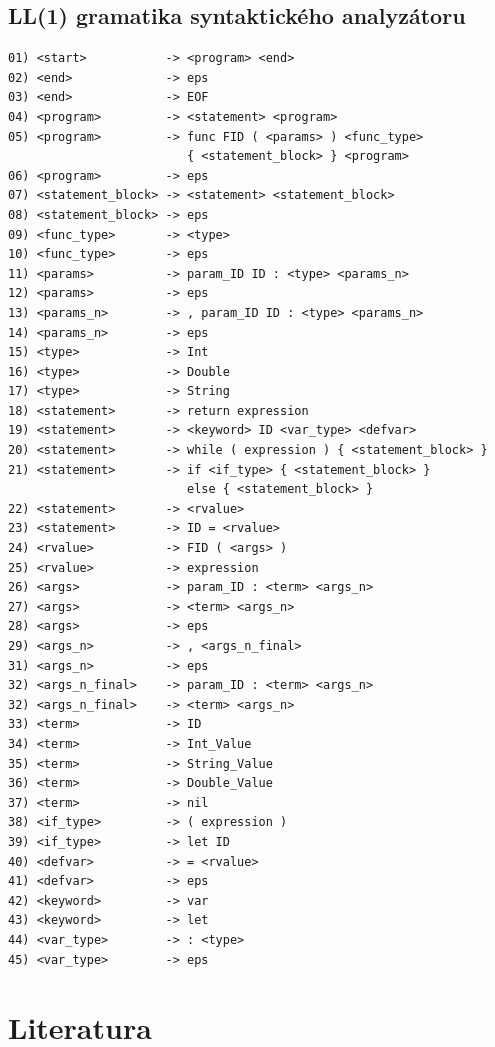 \documentclass[a4paper, 11pt]{article}
\begin{document}
\subsection{LL(1) gramatika syntaktického analyzátoru}
    \begin{verbatim}
01) <start>           -> <program> <end>
02) <end>             -> eps
03) <end>             -> EOF
04) <program>         -> <statement> <program>
05) <program>         -> func FID ( <params> ) <func_type> 
                         { <statement_block> } <program>
06) <program>         -> eps
07) <statement_block> -> <statement> <statement_block>
08) <statement_block> -> eps
09) <func_type>       -> <type>
10) <func_type>       -> eps
11) <params>          -> param_ID ID : <type> <params_n>
12) <params>          -> eps
13) <params_n>        -> , param_ID ID : <type> <params_n>
14) <params_n>        -> eps
15) <type>            -> Int
16) <type>            -> Double
17) <type>            -> String 
18) <statement>       -> return expression
19) <statement>       -> <keyword> ID <var_type> <defvar> 
20) <statement>       -> while ( expression ) { <statement_block> }
21) <statement>       -> if <if_type> { <statement_block> }
                         else { <statement_block> } 
22) <statement>       -> <rvalue> 
23) <statement>       -> ID = <rvalue> 
24) <rvalue>          -> FID ( <args> )
25) <rvalue>          -> expression
26) <args>            -> param_ID : <term> <args_n>
27) <args>            -> <term> <args_n>
28) <args>            -> eps
29) <args_n>          -> , <args_n_final>
31) <args_n>          -> eps
32) <args_n_final>    -> param_ID : <term> <args_n>
32) <args_n_final>    -> <term> <args_n>
33) <term>            -> ID
34) <term>            -> Int_Value
35) <term>            -> String_Value
36) <term>            -> Double_Value
37) <term>            -> nil
38) <if_type>         -> ( expression )
39) <if_type>         -> let ID
40) <defvar>          -> = <rvalue> 
41) <defvar>          -> eps
42) <keyword>         -> var
43) <keyword>         -> let
44) <var_type>        -> : <type>
45) <var_type>        -> eps
    \end{verbatim}
    \label{ll-grammar}

\newpage

\section{Literatura}

\renewcommand{\refname}{}

\end{document}
